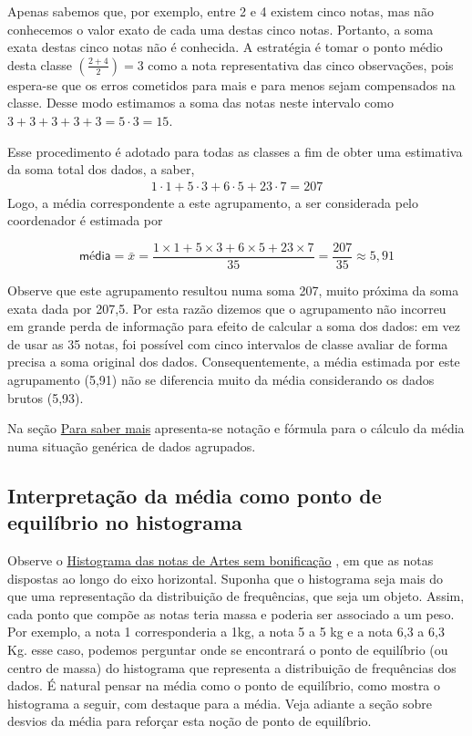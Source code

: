 Apenas sabemos que, por exemplo, entre 2 e 4 existem cinco notas, mas  não conhecemos o valor exato de cada uma destas cinco notas. Portanto, a soma exata destas cinco notas não é conhecida. A estratégia é tomar o ponto médio desta classe \(\left (\frac{2+4}{2}\right )=3\) como a nota representativa das cinco observações, pois espera-se que os erros cometidos para mais e para menos sejam compensados na classe. Desse modo estimamos a soma das notas neste intervalo como \(3+3+3+3+3=5\cdot 3=15\).

Esse procedimento é adotado para todas as classes a fim de obter uma estimativa da soma total dos dados, a saber,
\begin{equation*}
\begin{split}1\cdot 1+5\cdot 3+6\cdot 5+23\cdot 7=207\end{split}
\end{equation*}
Logo, a média correspondente a este agrupamento, a ser considerada pelo coordenador é estimada por

\begin{equation*}
\textsf{média}=\bar{x}=\frac{1\times 1+5\times 3+6\times 5+23\times 7}{35}=\frac{207}{35}\approx 5,91
\end{equation*}

Observe que este agrupamento resultou numa soma 207, muito próxima da soma exata dada por 207,5. Por esta razão dizemos que o agrupamento não incorreu em grande perda de informação para efeito de calcular a soma dos dados: em vez de usar as 35 notas, foi possível com cinco intervalos de classe avaliar de forma precisa a soma original dos dados. Consequentemente, a média estimada por este agrupamento (5,91) não se diferencia muito da média considerando os dados brutos (5,93).

Na seção \hyperref[\detokenize{PE104-A:sec-para-saber-mais}]{Para saber mais} apresenta-se notação e fórmula para o cálculo da média numa situação genérica de dados agrupados.

\subsection{Interpretação da média como ponto de equilíbrio no histograma}

Observe o \hyperref[\detokenize{PE104-0:fig-histograma-notas-sem-bonificacao}]{Histograma das notas de Artes sem bonificação} , em que as notas dispostas ao longo do eixo horizontal. Suponha que o histograma seja mais do que uma representação da distribuição de frequências, que seja um objeto. Assim, cada ponto que compõe as notas teria massa e poderia ser associado a um peso.  Por exemplo, a nota 1 corresponderia a 1kg, a nota 5 a 5 kg e a nota 6,3 a 6,3 Kg.  esse caso, podemos perguntar onde se encontrará o ponto de equilíbrio (ou centro de massa) do histograma que representa a distribuição de frequências dos dados. É natural pensar na média como o ponto de equilíbrio, como mostra o histograma a seguir, com destaque para a média. Veja adiante a seção sobre desvios da média para reforçar esta noção de ponto de equilíbrio.
\label{\detokenize{PE104-1:id1}}


